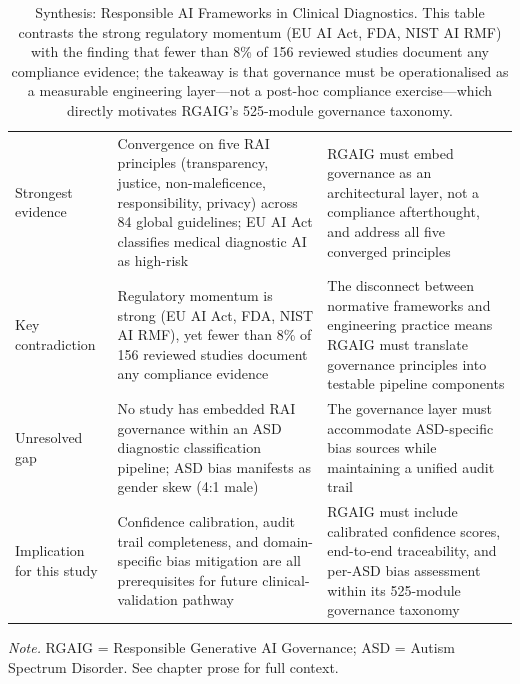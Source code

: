 {\tablestripes\tablefontsize
\begin{xltabular}{\textwidth}{@{} p{2.3cm} p{6.2cm} p{5.9cm} @{}}
\caption[Synthesis: Responsible AI Frameworks in Clinical]{Synthesis: Responsible AI Frameworks in Clinical Diagnostics. This table contrasts the strong regulatory momentum (EU AI Act, FDA, NIST AI RMF) with the finding that fewer than 8\% of 156 reviewed studies document any compliance evidence; the takeaway is that governance must be operationalised as a measurable engineering layer---not a post-hoc compliance exercise---which directly motivates RGAIG's 525-module governance taxonomy.}\label{tab:synth_responsible_ai} \\
\toprule
{} &  &  \\
\midrule
\endfirsthead
\endhead
\bottomrule
\endlastfoot
Strongest evidence & Convergence on five RAI principles (transparency, justice, non-maleficence, responsibility, privacy) across 84 global guidelines; EU AI Act classifies medical diagnostic AI as high-risk & RGAIG must embed governance as an architectural layer, not a compliance afterthought, and address all five converged principles \\
\addlinespace
Key contradiction & Regulatory momentum is strong (EU AI Act, FDA, NIST AI RMF), yet fewer than 8\% of 156 reviewed studies document any compliance evidence & The disconnect between normative frameworks and engineering practice means RGAIG must translate governance principles into testable pipeline components \\
\addlinespace
Unresolved gap & No study has embedded RAI governance within an ASD diagnostic classification pipeline; ASD bias manifests as gender skew (4:1 male) & The governance layer must accommodate ASD-specific bias sources while maintaining a unified audit trail \\
\addlinespace
Implication for this study & Confidence calibration, audit trail completeness, and domain-specific bias mitigation are all prerequisites for future clinical-validation pathway & RGAIG must include calibrated confidence scores, end-to-end traceability, and per-ASD bias assessment within its 525-module governance taxonomy \\
\end{xltabular}}
\vspace{0.3em}\noindent\textit{Note.} RGAIG = Responsible Generative AI Governance; ASD = Autism Spectrum Disorder. See chapter prose for full context.


